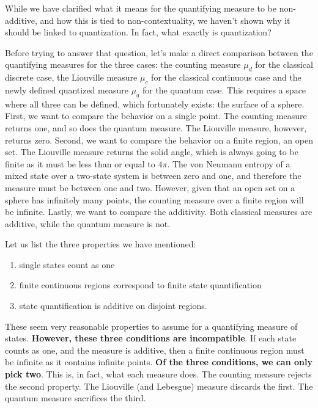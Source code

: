 \documentclass[entropy,article,submit,pdftex,moreauthors]{Definitions/mdpi}
\begin{document}
While we have clarified what it means for the quantifying measure to be non-additive, and how this is tied to non-contextuality, we haven't shown why it should be linked to quantization. In fact, what exactly is quantization?

Before trying to answer that question, let's make a direct comparison between the quantifying measures for the three cases: the counting measure $\mu_d$ for the classical discrete case, the Liouville measure $\mu_c$ for the classical continuous case and the newly defined quantized measure $\mu_q$ for the quantum case. This requires a space where all three can be defined, which fortunately exists: the surface of a sphere. First, we want to compare the behavior on a single point. The counting measure returns one, and so does the quantum measure. The Liouville measure, however, returns zero. Second, we want to compare the behavior on a finite region, an open set. The Liouville measure returns the solid angle, which is always going to be finite as it must be less than or equal to $4\pi$. The von Neumann entropy of a mixed state over a two-state system is between zero and one, and therefore the measure must be between one and two. However, given that an open set on a sphere has infinitely many points, the counting measure over a finite region will be infinite. Lastly, we want to compare the additivity. Both classical measures are additive, while the quantum measure is not.

Let us list the three properties we have mentioned:
\begin{enumerate}
	\item single states count as one
	\item finite continuous regions correspond to finite state quantification
	\item state quantification is additive on disjoint regions.
\end{enumerate}
These seem very reasonable properties to assume for a quantifying measure of states. \textbf{However, these three conditions are incompatible}. If each state counts as one, and the measure is additive, then a finite continuous region must be infinite as it contains infinite points. \textbf{Of the three conditions, we can only pick two}. This is, in fact, what each measure does. The counting measure rejects the second property. The Liouville (and Lebesgue) measure discards the first. The quantum measure sacrifices the third.
\end{document}
